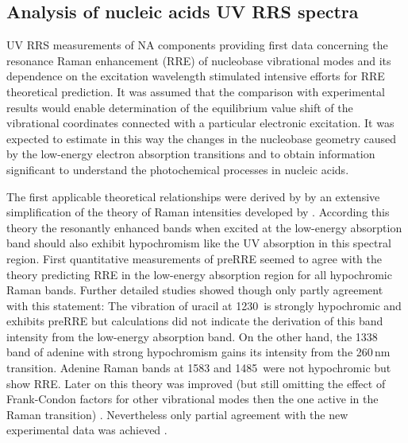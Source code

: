 \subsection{Analysis of nucleic acids UV RRS spectra}

UV RRS measurements of NA components providing first data concerning the
resonance Raman enhancement (RRE) of nucleobase vibrational modes and its
dependence on the excitation wavelength stimulated intensive efforts for RRE
theoretical prediction.
It was assumed that the comparison with experimental results would enable
determination of the equilibrium value shift of the vibrational coordinates
connected with a particular electronic excitation.
It was expected to estimate in this way the changes in the nucleobase geometry
caused by the low-energy electron absorption transitions and to obtain
information significant to understand the photochemical processes in nucleic
acids.

The first applicable theoretical relationships were derived by
\textcite{Peticolas1970}
by an extensive simplification of the theory of Raman intensities developed by
\textcite{Albrecht1961}.
According this theory the resonantly enhanced bands when excited at the
low-energy absorption band should also exhibit hypochromism like the UV
absorption in this spectral region.
First quantitative measurements of preRRE
\parencite{Kalantar1972}
seemed to agree with the theory predicting RRE in the low-energy absorption
region for all hypochromic Raman bands.
Further detailed studies showed though only partly agreement with this
statement:
The vibration of uracil at 1230\,\icm{} is strongly hypochromic
\parencite{%
	Small1971,%
	Small1971a%
}
and exhibits preRRE
\parencite{Tsuboi1971}
but calculations did not indicate the derivation of this band intensity from
the low-energy absorption band.
On the other hand, the 1338\,\icm{} band of adenine with strong hypochromism
\parencite{%
	Aylward1970,%
	Lafleur1972,%
	Small1971%
}
gains its intensity from the 260\,nm transition.
Adenine Raman bands at 1583 and 1485\,\icm{} were not hypochromic but show RRE.
Later on this theory was improved (but still omitting the effect of
Frank-Condon factors for other vibrational modes then the one active in the
Raman transition)
\parencite{%
	Blazej1977,%
	Warshel1977a%
}.
Nevertheless only partial agreement with the new experimental data was achieved
\parencite{%
	Peticolas1979,%
	Peticolas1980%
}.

